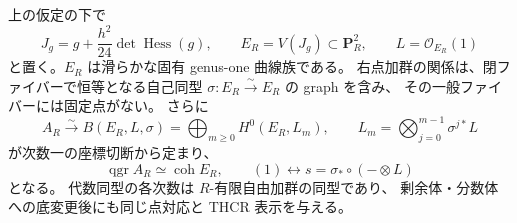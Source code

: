 \begin{proposition}
\label{prop:nfm-relative-active-thcr}
上の仮定の下で
\[
 J_g=g+\frac{h^2}{24}\det\operatorname{Hess}(g),\qquad
 E_R=V(J_g)\subset\mathbf P^2_R,\qquad L=\mathcal O_{E_R}(1)
\]
と置く。$E_R$ は滑らかな固有 genus-one 曲線族である。
右点加群の関係は、閉ファイバーで恒等となる自己同型
$\sigma:E_R\xrightarrow{\sim}E_R$ の graph を含み、
その一般ファイバーには固定点がない。
さらに
\begin{equation}\label{eq:nfm-relative-active-thcr}
 A_R\xrightarrow{\sim}
 B(E_R,L,\sigma)
 =\bigoplus_{m\ge0}H^0(E_R,L_m),\qquad
 L_m=\bigotimes_{j=0}^{m-1}\sigma^{j*}L
\end{equation}
が次数一の座標切断から定まり、
\[
 \operatorname{qgr}A_R\simeq\operatorname{coh}E_R,
 \qquad (1)\longleftrightarrow s=\sigma_*\circ(-\otimes L)
\]
となる。
代数同型の各次数は $R$-有限自由加群の同型であり、
剰余体・分数体への底変更後にも同じ点対応と THCR 表示を与える。
\end{proposition}

